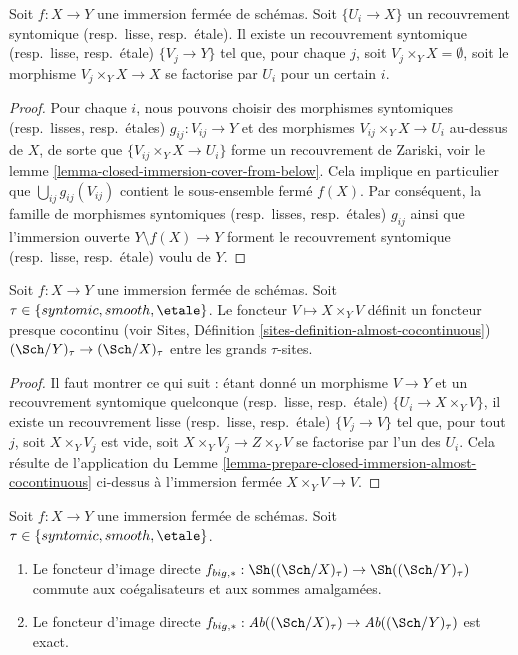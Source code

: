 \begin{lemma}
\label{lemma-prepare-closed-immersion-almost-cocontinuous}
Soit $f : X \to Y$ une immersion ferm\'ee de sch\'emas.
Soit $\{U_i \to X\}$ un recouvrement syntomique (resp.\ lisse, resp.\ \'etale).
Il existe un recouvrement syntomique (resp.\ lisse, resp.\ \'etale) $\{V_j \to Y\}$
tel que, pour chaque $j$, soit $V_j \times_Y X = \emptyset$, soit le
morphisme $V_j \times_Y X \to X$ se factorise par $U_i$ pour un certain $i$.
\end{lemma}

\begin{proof}
Pour chaque $i$, nous pouvons choisir des morphismes syntomiques (resp.\ lisses, resp.\ \'etales)
$g_{ij} : V_{ij} \to Y$ et des morphismes $V_{ij} \times_Y X \to U_i$ au-dessus de $X$,
de sorte que $\{V_{ij} \times_Y X \to U_i\}$ forme un recouvrement de Zariski, voir
le lemme \ref{lemma-closed-immersion-cover-from-below}.
Cela implique en particulier que
$\bigcup_{ij} g_{ij}(V_{ij})$ contient le sous-ensemble ferm\'e $f(X)$.
Par cons\'equent, la famille de morphismes syntomiques (resp.\ lisses, resp.\ \'etales) $g_{ij}$
ainsi que l'immersion ouverte $Y \setminus f(X) \to Y$ forment le recouvrement
syntomique (resp.\ lisse, resp.\ \'etale) voulu de $Y$.
\end{proof}

\begin{lemma}
\label{lemma-closed-immersion-almost-cocontinuous}
Soit $f : X \to Y$ une immersion ferm\'ee de sch\'emas.
Soit $\tau \in \{syntomic, smooth, \etale\}$.
Le foncteur $V \mapsto X \times_Y V$ d\'efinit un foncteur presque
cocontinu (voir
Sites, D\'efinition \ref{sites-definition-almost-cocontinuous})
$(\Sch/Y)_\tau \to (\Sch/X)_\tau$ entre les
grands $\tau$-sites.
\end{lemma}

\begin{proof}
Il faut montrer ce qui suit : \'etant donn\'e un morphisme $V \to Y$
et un recouvrement syntomique quelconque (resp.\ lisse, resp.\ \'etale)
$\{U_i \to X \times_Y V\}$, il existe un
recouvrement lisse (resp.\ lisse, resp.\ \'etale) $\{V_j \to V\}$
tel que, pour tout $j$, soit $X \times_Y V_j$ est vide, soit
$X \times_Y V_j \to Z \times_Y V$ se factorise par l'un des
$U_i$. Cela r\'esulte de l'application du
Lemme \ref{lemma-prepare-closed-immersion-almost-cocontinuous}
ci-dessus \`a l'immersion ferm\'ee $X \times_Y V \to V$.
\end{proof}

\begin{lemma}
\label{lemma-closed-immersion-pushforward-exact}
Soit $f : X \to Y$ une immersion ferm\'ee de sch\'emas.
Soit $\tau \in \{syntomic, smooth, \etale\}$.
\begin{enumerate}
\item Le foncteur d'image directe
$f_{big, *} :
\Sh((\Sch/X)_\tau)
\to
\Sh((\Sch/Y)_\tau)$
commute aux co\'egalisateurs et aux sommes amalgam\'ees.
\item Le foncteur d'image directe
$f_{big, *} :
\textit{Ab}((\Sch/X)_\tau)
\to
\textit{Ab}((\Sch/Y)_\tau)$
est exact.
\end{enumerate}
\end{lemma}


